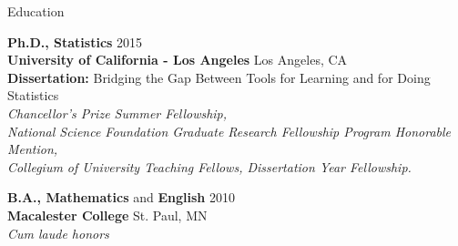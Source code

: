 \documentclass{resume} %
\begin{document}

\begin{rSection}{Education}

{\bf Ph.D., Statistics} \hfill 2015\\ 
{\bf University of California - Los Angeles} \hfill Los Angeles, CA \\
{\bf Dissertation:} Bridging the Gap Between Tools for Learning and for Doing Statistics \\
\emph{Chancellor's Prize Summer Fellowship, \\ National Science Foundation Graduate Research Fellowship Program Honorable Mention, \\ Collegium of University Teaching Fellows, Dissertation Year Fellowship.}

{\bf B.A., Mathematics} and {\bf English}  \hfill  2010 \\
{\bf Macalester College} \hfill St. Paul, MN \\ 
\emph{Cum laude honors}
\end{rSection}

\end{document}
